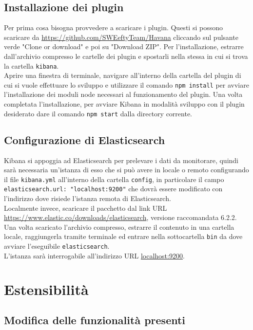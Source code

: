 \subsection{Installazione dei plugin}
Per prima cosa bisogna provvedere a scaricare i plugin. Questi si possono scaricare da \href{https://github.com/SWEeftyTeam/Havana}{https://github.com/SWEeftyTeam/Havana} cliccando sul pulsante verde "Clone or download" e poi su "Download ZIP".
Per l'installazione, estrarre dall'archivio compresso le cartelle dei plugin e spostarli nella stessa  in cui si trova la cartella \texttt{kibana}.\\
Aprire una finestra di terminale, navigare all'interno della cartella del plugin di cui si vuole effettuare lo sviluppo e utilizzare il comando \texttt{npm install} per avviare l'installazione dei moduli node necessari al funzionamento del plugin.
Una volta completata l'installazione, per avviare Kibana in modalità sviluppo con il plugin desiderato dare il comando \texttt{npm start} dalla directory corrente.
\subsection{Configurazione di Elasticsearch}
Kibana si appoggia ad Elasticsearch per prelevare i dati da monitorare, quindi sarà necessaria un'istanza di esso che si può avere in locale o remoto configurando il file \texttt{kibana.yml} all'interno della cartella \texttt{config}, in particolare il campo \texttt{elasticsearch.url: "localhost:9200"} che dovrà essere modificato con l'indirizzo dove risiede l'istanza remota di Elasticsearch.\\
Localmente invece, scaricare il pacchetto dal link URL \url{https://www.elastic.co/downloads/elasticsearch}, versione raccomandata 6.2.2.
Una volta scaricato l'archivio compresso, estrarre il contenuto in una cartella locale, raggiungerla tramite terminale ed entrare nella sottocartella \texttt{bin} da dove avviare l'eseguibile \texttt{elasticsearch}.\\
L'istanza sarà interrogabile all'indirizzo URL \url{localhost:9200}.
\newpage
\section{Estensibilità}
\subsection{Modifica delle funzionalità presenti}
